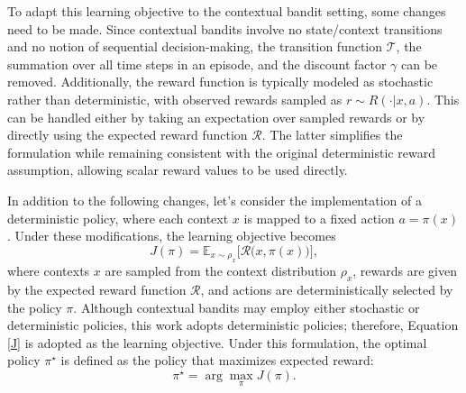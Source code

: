\documentclass[./dissertation.tex]{subfiles}
\begin{document}
To adapt this learning objective to the contextual bandit setting, some changes need to be made. Since contextual bandits involve no state/context transitions and no notion of sequential decision-making, the transition function $\mathcal{T}$, the summation over all time steps in an episode, and the discount factor $\gamma$ can be removed. Additionally, the reward function is typically modeled as stochastic rather than deterministic, with observed rewards sampled as $r \sim R(\cdot|x,a)$. This can be handled either by taking an expectation over sampled rewards or by directly using the expected reward function $\mathcal{R}$. The latter simplifies the formulation while remaining consistent with the original deterministic reward assumption, allowing scalar reward values to be used directly.

In addition to the following changes, let's consider the implementation of a deterministic policy, where each context $x$ is mapped to a fixed action $a = \pi(x)$. Under these modifications, the learning objective becomes
\begin{equation}
J(\pi) = \mathbb{E}_{x \sim \rho_x}\Big[\mathcal{R}\big(x,\pi(x)\big)\Big],
\label{J}
\end{equation}
where contexts $x$ are sampled from the context distribution $\rho_x$, rewards are given by the expected reward function $\mathcal{R}$, and actions are deterministically selected by the policy $\pi$. Although contextual bandits may employ either stochastic or deterministic policies, this work adopts deterministic policies; therefore, Equation \ref{J} is adopted as the learning objective. Under this formulation, the optimal policy $\pi^\star$ is defined as the policy that maximizes expected reward:
\begin{equation}
\pi^\star = 
\arg\max_{\pi} J(\pi).
\end{equation}
\end{document}
